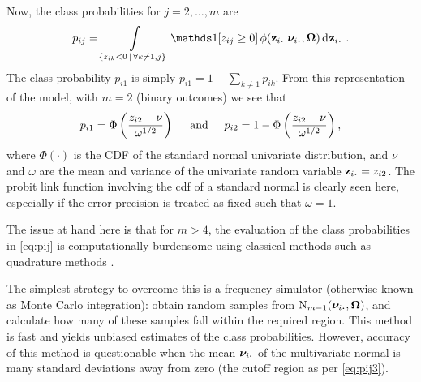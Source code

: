 Now, the class probabilities for $j=2,\dots,m$ are
\begin{align}
  p_{ij} = 
  \int\displaylimits_{\{z_{ik} < 0 \,|\, \forall k \neq 1,j \}} \ind[z_{ij} \geq 0] \,\phi(\bz_{i\bigcdot} |\bnu_{i\bigcdot}, \bOmega) \dint\bz_{i\bigcdot} \ . \label{eq:pij3}
\end{align}
The class probability $p_{i1}$ is simply $p_{i1} = 1- \sum_{k\neq 1} p_{ik}$.
From this representation of the model, with $m=2$ (binary outcomes) we see that
\[
  p_{i1} = 
  \Phi \left( \frac{z_{i2} - \nu}{\omega^{1/2}} \right)
  \hspace{0.5cm}\text{and}\hspace{0.5cm}
  p_{i2} = 
  1 - \Phi \left( \frac{z_{i2} - \nu}{\omega^{1/2}} \right),
\]
where $\Phi(\cdot)$ is the CDF of the standard normal univariate distribution, and $\nu$ and $\omega$ are the mean and variance of the univariate random variable $\bz_{i\bigcdot} = z_{i2}$.
The probit link function involving the cdf of a standard normal is clearly seen here, especially if the error precision is treated as fixed such that $\omega = 1$. 

The issue at hand here is that for $m>4$, the evaluation of the class probabilities in \cref{eq:pij} is computationally burdensome using classical methods such as quadrature methods \citet{geweke1994alternative}.

The simplest strategy to overcome this is a frequency simulator (otherwise known as Monte Carlo integration): obtain random samples from $\N_{m-1}(\bnu_{i\bigcdot}, \bOmega)$, and calculate how many of these samples fall within the required  region.
This method is fast and yields unbiased estimates of the class probabilities.
However, accuracy of this method is questionable when the mean $\bnu_{i\bigcdot}$ of the multivariate normal is many standard deviations away from zero (the cutoff region as per \cref{eq:pij3}).

